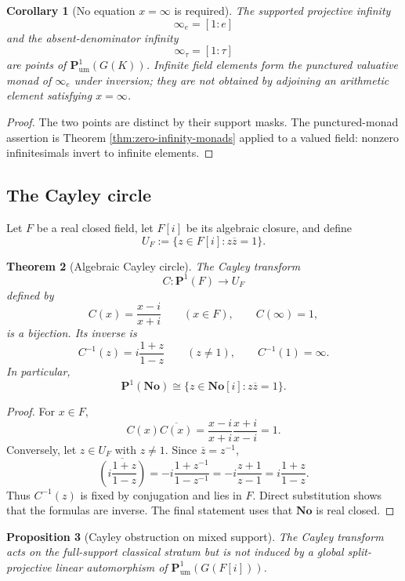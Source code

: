 \documentclass[11pt]{amsart}
\numberwithin{equation}{section}
\newtheorem{theorem}{Theorem}[section]
\newtheorem{proposition}[theorem]{Proposition}
\newtheorem{corollary}[theorem]{Corollary}
\theoremstyle{definition}
\newcommand{\No}{\mathbf{No}}
\newcommand{\Pum}{\mathbf P_{\mathrm{um}}}
\begin{document}
\begin{corollary}[No equation $x=\infty$ is required]\label{cor:no-x-infinity}
The supported projective infinity
\[
\infty_e=[1:e]
\]
and the absent-denominator infinity
\[
\infty_\tau=[1:\tau]
\]
are points of $\Pum^1(G(K))$.  Infinite field elements form the punctured valuative monad of $\infty_e$ under inversion; they are not obtained by adjoining an arithmetic element satisfying $x=\infty$.
\end{corollary}

\begin{proof}
The two points are distinct by their support masks.  The punctured-monad assertion is Theorem \ref{thm:zero-infinity-monads} applied to a valued field: nonzero infinitesimals invert to infinite elements.
\end{proof}

\subsection{The Cayley circle}

Let $F$ be a real closed field, let $F[i]$ be its algebraic closure, and define
\[
U_F:=\{z\in F[i]:z\overline z=1\}.
\]

\begin{theorem}[Algebraic Cayley circle]\label{thm:cayley-circle}
The Cayley transform
\[
C:\mathbf P^1(F)\longrightarrow U_F
\]
defined by
\[
C(x)=\frac{x-i}{x+i}
\qquad(x\in F),
\qquad
C(\infty)=1,
\]
is a bijection.  Its inverse is
\[
C^{-1}(z)=i\frac{1+z}{1-z}
\qquad(z\neq1),
\qquad
C^{-1}(1)=\infty.
\]
In particular,
\[
\mathbf P^1(\No)
\cong
\{z\in\No[i]:z\overline z=1\}.
\]
\end{theorem}

\begin{proof}
For $x\in F$,
\[
C(x)\overline{C(x)}
=
\frac{x-i}{x+i}\frac{x+i}{x-i}=1.
\]
Conversely, let $z\in U_F$ with $z\neq1$.  Since $\overline z=z^{-1}$,
\[
\overline{\left(i\frac{1+z}{1-z}\right)}
=
-i\frac{1+z^{-1}}{1-z^{-1}}
=
-i\frac{z+1}{z-1}
=
i\frac{1+z}{1-z}.
\]
Thus $C^{-1}(z)$ is fixed by conjugation and lies in $F$.  Direct substitution shows that the formulas are inverse.  The final statement uses that $\No$ is real closed.
\end{proof}

\begin{proposition}[Cayley obstruction on mixed support]\label{prop:cayley-obstruction}
The Cayley transform acts on the full-support classical stratum but is not induced by a global split-projective linear automorphism of $\Pum^1(G(F[i]))$.
\end{proposition}
\end{document}
